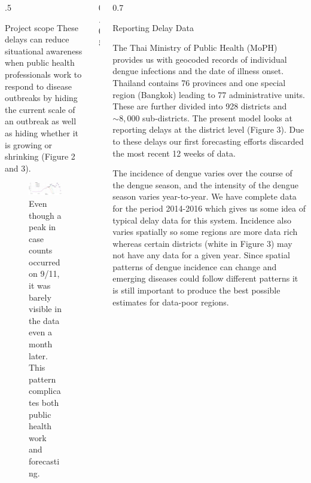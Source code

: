 \documentclass[final]{beamer}
\newlength{\onecolwid}
\begin{document}
\begin{frame}[t]
\begin{columns}[t]
\begin{column}{.5\onecolwid}
\begin{block}{Project scope}
These delays can reduce situational awareness when public health professionals work to respond to disease outbreaks by hiding the current scale of an outbreak as well as hiding whether it is growing or shrinking (Figure 2 and 3).

\vspace{0.2in}

\begin{figure}
 \begin{center}
    \includegraphics[width=1 \textwidth]{reporting-is-relevant-short}
 \end{center}
 \caption{\small Even though a peak in case counts occurred on 9/11, it was barely visible in the data even a month later.  This pattern complicates both public health work and forecasting.}
\end{figure}

\end{block}
\end{column}

\begin{column}{0.05\onecolwid}
\end{column}

\begin{column}{0.7\onecolwid}

\begin{block}{Reporting Delay Data}

The Thai Ministry of Public Health (MoPH) provides us with geocoded records of individual dengue infections and the date of illness onset.  Thailand contains 76 provinces and one special region (Bangkok) leading to 77 administrative units.  These are further divided into 928 districts and $\sim8,000$ sub-districts.  The present model looks at reporting delays at the district level (Figure 3).  Due to these delays our first forecasting efforts discarded the most recent 12 weeks of data.

\vspace{0.2in}

The incidence of dengue varies over the course of the dengue season, and the intensity of the dengue season varies year-to-year.  We have complete data for the period 2014-2016 which gives us some idea of typical delay data for this system.  Incidence also varies spatially so some regions are more data rich whereas certain districts (white in Figure 3) may not have any data for a given year.  Since spatial patterns of dengue incidence can change and emerging diseases could follow different patterns it is still important to produce the best possible estimates for data-poor regions.


\end{block}
\end{column}
\end{columns}
\end{frame}
\end{document}
